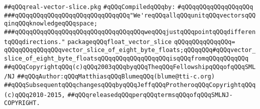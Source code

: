 \label{src/lib/std/float-vector-slice.pkg}
\verb|##qQQqreal-vector-slice.pkg|\newline
\newline
\verb|#qQQqCompiledqQQqby:|\newline
\verb|#qQQqqQQqqQQqqQQqqQQq|\newline
\newline
\newline
\newline
\verb|###qQQqqQQqqQQqqQQqqQQqqQQqqQQqqQQq"We'reqQQqallqQQqunitqQQqvectorsqQQqinqQQqknowledgeqQQqspace;|\newline
\verb|###qQQqqQQqqQQqqQQqqQQqqQQqqQQqqQQqqQQqweqQQqjustqQQqpointqQQqdifferentqQQqdirections."|\newline
\newline
\newline
\newline
\verb|packageqQQqfloat_vector_slice|\newline
\verb|qQQqqQQqqQQqqQQq=|\newline
\verb|qQQqqQQqqQQqqQQqvector_slice_of_eight_byte_floats;qQQqqQQq#qQQqvector_slice_of_eight_byte_floatsqQQqqQQqqQQqqQQqqQQqisqQQqfromqQQqqQQqqQQq|\newline
\newline
\newline
\newline
\verb|##qQQqCopyrightqQQq(c)qQQq2003qQQqbyqQQqTheqQQqFellowshipqQQqofqQQqSML/NJ|\newline
\verb|##qQQqAuthor:qQQqMatthiasqQQqBlumeqQQq(blume@tti-c.org)|\newline
\verb|##qQQqSubsequentqQQqchangesqQQqbyqQQqJeffqQQqProtheroqQQqCopyrightqQQq(c)qQQq2010-2015,|\newline
\verb|##qQQqreleasedqQQqperqQQqtermsqQQqofqQQqSMLNJ-COPYRIGHT.|\newline

